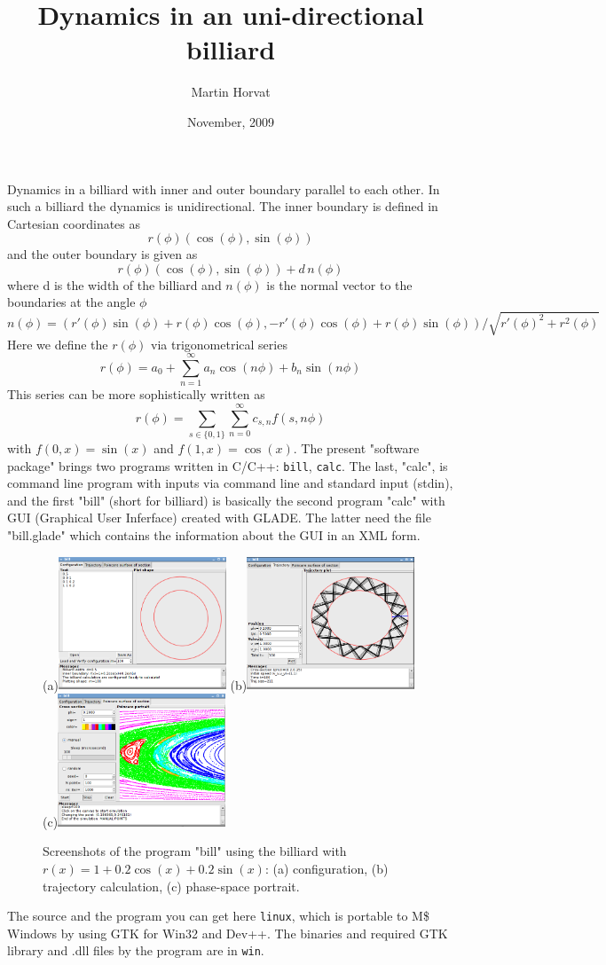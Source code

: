 \documentclass[11pt]{article}
\title{\vspace{-2cm}Dynamics in an uni-directional billiard}
\author{Martin Horvat}
\date{November, 2009}
\begin{document}
\maketitle

Dynamics in a billiard with inner and outer boundary parallel to each other. In such a billiard the dynamics is unidirectional. The inner boundary is defined in Cartesian coordinates as
%
$$
  r(\phi) (\cos(\phi), \sin(\phi))
$$
%
and the outer boundary is given as
%
$$ 
r(\phi) (\cos(\phi), \sin(\phi)) +d\,n(\phi) 
$$
%
where d is the width of the billiard and $n(\phi)$ is the normal vector to the boundaries at the angle $\phi$
%
$$
n(\phi) = (r'(\phi)\sin(\phi) + r(\phi)\cos(\phi),-r'(\phi)\cos(\phi) + r(\phi)\sin(\phi))/\sqrt{r'(\phi)^2+r^2(\phi)}
$$
%
Here we define the $r(\phi)$ via trigonometrical series
%
$$
r(\phi) = a_0 + \sum_{n=1}^\infty a_n \cos(n \phi) + b_n \sin(n \phi)
$$
%
This series can be more sophistically written as
%
$$
r(\phi) = \sum_{s \in \{0,1\}} \sum_{n=0}^\infty c_{s,n} f(s,n \phi)
$$
%
with $f(0,x) = \sin(x)$ and $f(1,x)=\cos(x)$. The present "software package" brings two programs written in C/C++: \verb|bill|, \verb|calc|. The last, "calc", is command line program with inputs via command line and standard input (stdin), and the first "bill" (short for billiard) is basically the second program "calc" with GUI (Graphical User Inferface) created with GLADE. The latter need the file "bill.glade" which contains the information about the GUI in an XML form.
%
\begin{figure}[!htb]
\centering
(a)\includegraphics[width=5cm]{screen1.png}
(b)\includegraphics[width=5cm]{screen2.png}
(c)\includegraphics[width=5cm]{screen3.png}
\caption{Screenshots of the program "bill" using the billiard with $r(x)=1+0.2\cos(x)+0.2\sin(x)$: (a) configuration, (b) trajectory calculation,
(c) phase-space portrait. }
\end{figure}

The source and the program you can get here \verb|linux|, which is portable to M\$ Windows by using GTK for Win32 and Dev++. The binaries and required GTK library and .dll files by the program are in \verb|win|.
\end{document}
